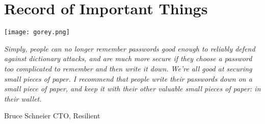 \documentclass[12pt]{book}
\begin{document}



\newpage

\chapter*{Record of Important Things}

\begin{center}
	\texttt{[image: gorey.png]}
\end{center}

\begin{small}
\textit{Simply, people can no longer remember passwords good enough to reliably defend against dictionary attacks, and are much more secure if they choose a password too complicated to remember and then write it down. We're all good at securing small pieces of paper. I recommend that people write their passwords down on a small piece of paper, and keep it with their other valuable small pieces of paper: in their wallet.}
\begin{flushright}{Bruce Schneier CTO, Resilient}\end{flushright}
\end{small}



\clearpage
{}
\pagestyle{headings}



























































\cleardoublepage

\newpage
{}
\fontsize{7}{3mm}\selectfont
\begin{multicols}{5}
	\noindent
\end{multicols}
\restoregeometry




\end{document}
